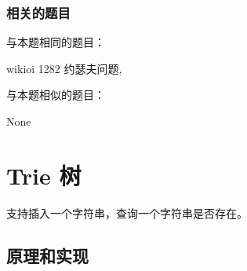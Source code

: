 \subsubsection{相关的题目}
与本题相同的题目：
\begindot
\item wikioi 1282 约瑟夫问题, 
\myenddot

与本题相似的题目：
\begindot
\item None
\myenddot


\section{Trie 树} %
支持插入一个字符串，查询一个字符串是否存在。


\subsection{原理和实现}

